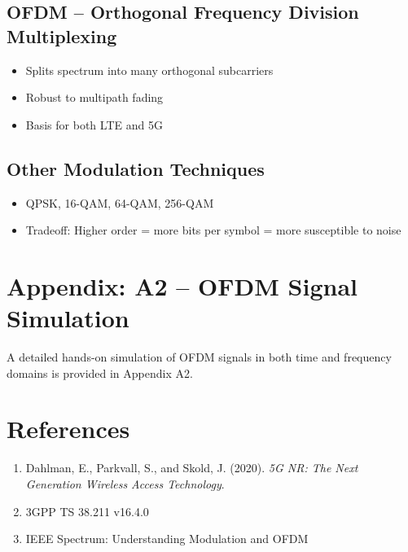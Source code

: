 \subsection{OFDM – Orthogonal Frequency Division Multiplexing}
\begin{itemize}
  \item Splits spectrum into many orthogonal subcarriers
  \item Robust to multipath fading
  \item Basis for both LTE and 5G
\end{itemize}

\subsection{Other Modulation Techniques}
\begin{itemize}
  \item QPSK, 16-QAM, 64-QAM, 256-QAM
  \item Tradeoff: Higher order = more bits per symbol = more susceptible to noise
\end{itemize}

\section{Appendix: A2 – OFDM Signal Simulation}
A detailed hands-on simulation of OFDM signals in both time and frequency domains is provided in Appendix A2.

\section{References}
\begin{enumerate}
  \item Dahlman, E., Parkvall, S., and Skold, J. (2020). \textit{5G NR: The Next Generation Wireless Access Technology}.
  \item 3GPP TS 38.211 v16.4.0
  \item IEEE Spectrum: Understanding Modulation and OFDM
\end{enumerate}
